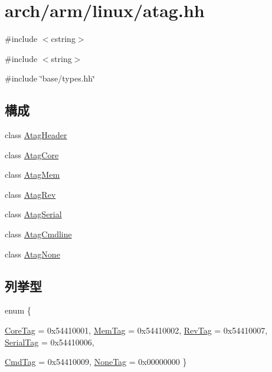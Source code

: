 \hypertarget{atag_8hh}{
\section{arch/arm/linux/atag.hh}
\label{atag_8hh}
}
{\ttfamily \#include $<$cstring$>$}\par
{\ttfamily \#include $<$string$>$}\par
{\ttfamily \#include \char`\"{}base/types.hh\char`\"{}}\par
\subsection*{構成}
\begin{DoxyCompactItemize}
\item 
class \hyperlink{classAtagHeader}{AtagHeader}
\item 
class \hyperlink{classAtagCore}{AtagCore}
\item 
class \hyperlink{classAtagMem}{AtagMem}
\item 
class \hyperlink{classAtagRev}{AtagRev}
\item 
class \hyperlink{classAtagSerial}{AtagSerial}
\item 
class \hyperlink{classAtagCmdline}{AtagCmdline}
\item 
class \hyperlink{classAtagNone}{AtagNone}
\end{DoxyCompactItemize}
\subsection*{列挙型}
\begin{DoxyCompactItemize}
\item 
enum \{ \par
\hyperlink{atag_8hh_abc6126af1d45847bc59afa0aa3216b04a54602c6f0b76ddb3b8295d170643a369}{CoreTag} =  0x54410001, 
\hyperlink{atag_8hh_abc6126af1d45847bc59afa0aa3216b04adf74b176ba05c6e0f924faa5865ff4fe}{MemTag} =  0x54410002, 
\hyperlink{atag_8hh_abc6126af1d45847bc59afa0aa3216b04a3f7c87117971f71fb2dde3759455dbe4}{RevTag} =  0x54410007, 
\hyperlink{atag_8hh_abc6126af1d45847bc59afa0aa3216b04a757f9e2f30906ae8ff3fd450cc6ea758}{SerialTag} =  0x54410006, 
\par
\hyperlink{atag_8hh_abc6126af1d45847bc59afa0aa3216b04a1c868752783cb3588056014827964e85}{CmdTag} =  0x54410009, 
\hyperlink{atag_8hh_abc6126af1d45847bc59afa0aa3216b04ab8aec838eededacd11098ec95d303ee3}{NoneTag} =  0x00000000
 \}
\end{DoxyCompactItemize}


